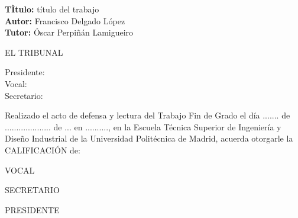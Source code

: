 \cleardoublepage

\begin{flushleft} \large
	\textbf{TÌtulo:} título del trabajo \\
	\textbf{Autor:} Francisco Delgado López\\
	\textbf{Tutor:} Óscar Perpiñán Lamigueiro \\ [1 cm]
	
\end{flushleft} 

\begin{center} \LARGE
	EL TRIBUNAL \\ [1 cm]
\end{center}

\begin{flushleft} \LARGE
	Presidente: \\ [1 cm]
	Vocal: \\ [1 cm]
	Secretario: \\ [1.5 cm]
\end{flushleft}

\large
Realizado el acto de defensa y lectura del Trabajo Fin de Grado el día ....... de ....................   de ... en .........., en la Escuela Técnica Superior de Ingeniería y Diseño Industrial de la Universidad Politécnica de Madrid, acuerda otorgarle la CALIFICACIÓN de: \\ [2 cm]

\begin{center}
	\large VOCAL \\ [2.2 cm]
\end{center}

\begin{minipage}{0.5\textwidth}
	\begin{flushleft}
		\large SECRETARIO
	\end{flushleft}
\end{minipage}
\begin{minipage}{0.5\textwidth}
	\begin{flushright}
		\large PRESIDENTE
	\end{flushright} 
\end{minipage}